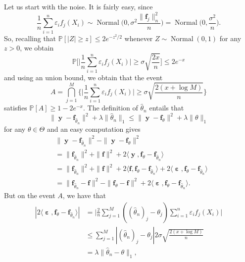 \documentclass[
	fontsize=11pt, %
	twoside=false, %
	numbers=noenddot, %
]{kaobook}
\renewcommand{\bf}{{\boldsymbol f}}
\DeclareMathOperator{\by}{{\boldsymbol y}}
\DeclareMathOperator{\beps}{\boldsymbol \varepsilon}
\DeclareMathOperator{\nor}{Normal}
\newcommand{\eps}{\varepsilon}
\renewcommand{\P}{\mathbb P}
\newcommand{\wh}{\widehat}
\newcommand{\norm}[1]{\| #1 \|}
\newcommand{\inr}[1]{\langle #1 \rangle}
\begin{document}
Let us start with the noise. It is fairly easy, since
\begin{equation*}
	\frac 1n \sum_{i=1}^n \eps_i f_j(X_i) \sim 
	\nor\Big( 0, \sigma^2 \frac{\norm{\bf_j}_n^2}{n} \Big) 
	= \nor\Big( 0, \frac{\sigma^2}{n} \Big).
\end{equation*}
So, recalling that $\P[|Z| \geq z] \leq 2e^{-z^2 / 2}$ whenever $Z \sim \nor(0, 1)$ for any $z > 0$,%
we obtain
\begin{equation*}
	\P \bigg[ \Big| \frac 1n \sum_{i=1}^n \eps_i f_j(X_i) \Big| \geq \sigma \sqrt{\frac{2 x}{n}} \bigg] \leq 2 e^{-x}
\end{equation*}
and using an union bound, we obtain that the event
\begin{equation*}
	A = \bigcap_{j=1}^M \bigg\{ \Big| \frac 1n \sum_{i=1}^n \eps_i f_j(X_i) \Big| \geq \sigma \sqrt{\frac{2 (x + \log M)}{n}} \bigg\}
\end{equation*}
satisfies $\P[A] \geq 1 - 2e^{-x}$.
The definition of $\wh \theta_n$ entails that
\begin{equation}
	\label{eq:proof-oracle-slow-step1}
	\norm{\by - \bf_{\wh \theta_n}}^2 + \lambda \norm{\wh \theta_n}_1 
	\leq \norm{\by - \bf_\theta}^2 + \lambda \norm{\theta}_1
\end{equation}
for any $\theta \in \Theta$ and an easy computation gives
\begin{equation}
	\label{eq:proof-oracle-slow-step2}
	\begin{split}
	&\norm{\by - \bf_{\wh \theta_n}}^2 - \norm{\by - \bf_\theta}^2 \\
	&= \norm{\bf_{\wh \theta_n}}^2 + \norm{\bf}^2 + 2 \inr{\by, \bf_{\theta} - \bf_{\wh \theta_n}} \\
	&= \norm{\bf_{\wh \theta_n}}^2 + \norm{\bf}^2 + 2 \inr{\bf, \bf_{\theta} - \bf_{\wh \theta_n}} + 2 \inr{\beps, \bf_{\theta} - \bf_{\wh \theta_n}} \\
	&= \norm{\bf_{\wh \theta_n} - \bf}^2 - \norm{\bf_\theta - \bf}^2 + 
	2 \inr{\beps, \bf_{\theta} - \bf_{\wh \theta_n}}.
	\end{split}
\end{equation}
But on the event $A$, we have that
\begin{equation}
	\label{eq:proof-oracle-slow-step3}
	\begin{split}
	| 2 \inr{\beps, \bf_{\theta} - \bf_{\wh \theta_n}} | 
	&= \Big| \frac 2n \sum_{j=1}^M ((\wh \theta_n)_j - \theta_j ) 
	\sum_{i=1}^n \eps_i f_j(X_i) \Big| \\
	&\leq \sum_{j=1}^M | (\wh \theta_n)_j - \theta_j | 2 \sigma \sqrt{\frac{2 (x + \log M)}{n}} \\
	&= \lambda \norm{\wh \theta_n - \theta}_1,	
	\end{split}
\end{equation}
\end{document}
